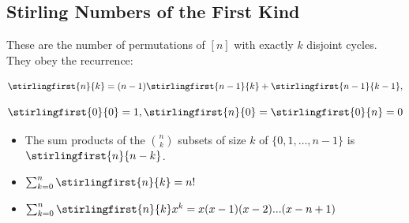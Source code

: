 \subsection{Stirling Numbers of the First Kind} These are the number of permutations of $[n]$ with exactly $k$ disjoint cycles. They obey the recurrence:

  \begin{equation*}
    \stirlingfirst{n}{k} = (n-1)\stirlingfirst{n-1}{k} + \stirlingfirst{n-1}{k-1},
  \end{equation*}

  \begin{equation*}
    \stirlingfirst{0}{0} = 1, \stirlingfirst{n}{0} = \stirlingfirst{0}{n} = 0
  \end{equation*}

\begin{itemize}
    \item The sum products of the $\binom{n}{k}$ subsets of size $k$ of $\{0, 1, \dots, n-1\}$ is $\stirlingfirst{n}{n-k}$.

    \item $\sum_{k=0}^n \stirlingfirst{n}{k} = n!$

    \item $\sum_{k=0}^{n}\stirlingfirst{n}{k}x^k = x(x-1)(x-2)...(x-n+1)$
\end{itemize}
